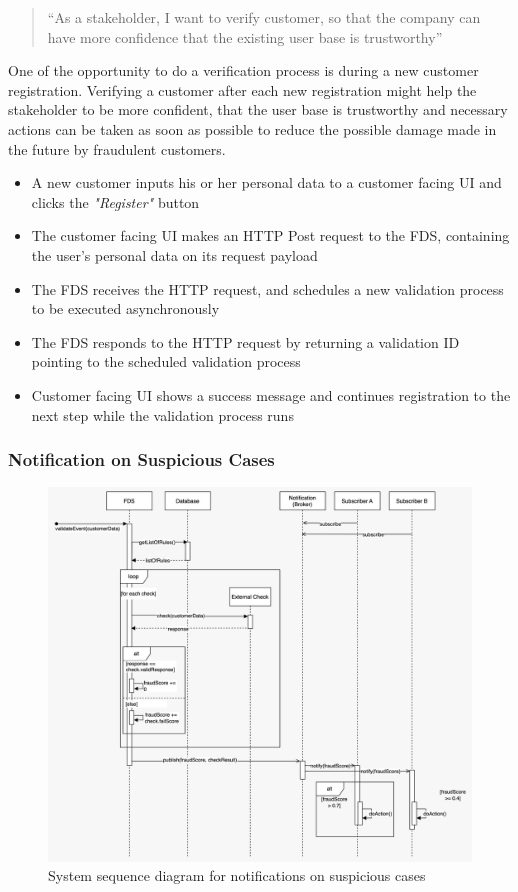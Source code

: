 \begin{quotation}
 \enquote{As a stakeholder, I want to verify customer, so that the company can have more confidence that the existing user base is trustworthy} 
\end{quotation}

One of the opportunity to do a verification process is during a new customer registration. Verifying a customer after each new registration might help the stakeholder to be more confident, that the user base is trustworthy and necessary actions can be taken as soon as possible to reduce the possible damage made in the future by fraudulent customers.
\begin{itemize}
 \item A new customer inputs his or her personal data to a customer facing UI and clicks the \emph{"Register"} button
 \item The customer facing UI makes an HTTP Post request to the FDS, containing the user's personal data on its request payload
 \item The FDS receives the HTTP request, and schedules a new validation process to be executed asynchronously
 \item The FDS responds to the HTTP request by returning a validation ID pointing to the scheduled validation process
 \item Customer facing UI shows a success message and continues registration to the next step while the validation process runs 
\end{itemize}


\subsubsection{Notification on Suspicious Cases}
 \label{subsection:seq-notification}

\begin{figure}[!h]
 \includegraphics[width=\textwidth]{diagrams/sequence_notification.jpeg}
 \caption{System sequence diagram for notifications on suspicious cases}
\end{figure}

